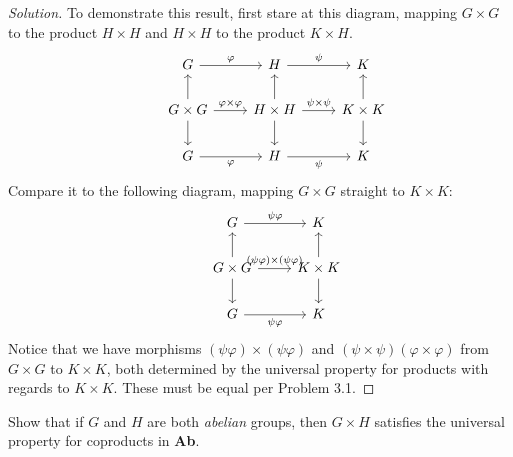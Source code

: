 \documentclass[12pt]{article}
\newenvironment{problem}[2][Problem]{\begin{trivlist}
\item[\hskip \labelsep {\bfseries #1}\hskip \labelsep {\bfseries #2.}]}{\end{trivlist}}
\newcommand{\catname}[1]{\normalfont\textbf{#1}}
\newenvironment{solution}
  {\renewcommand\qedsymbol{$\blacksquare$}\begin{proof}[Solution]}
{\end{proof}}
\begin{document}
\begin{solution}
  To demonstrate this result, first stare at this diagram, mapping 
  $G\times G$ to the product $H\times H$ and 
  $H\times H$ to the product $K\times H$.
  \[\begin{tikzcd}
    & G\ar{r}{\varphi} & H\ar{r}{\psi} & K \\
    & G\times G \ar{r}{\varphi\times\varphi}
    \ar{u}\ar{d} 
    & H\times H \ar{r}{\psi\times\psi}
    \ar{u}\ar{d} 
    & K\times K \ar{u} \ar{d} \\
    & G\ar{r}[swap]{\varphi} & H\ar{r}[swap]{\psi} & K 
\end{tikzcd}\]
Compare it to the following diagram, mapping 
$G\times G$ straight to $K\times K$:
\[\begin{tikzcd}
  & G\ar{r}{\psi\varphi} & K\\
  & G\times G \ar{r}{(\psi\varphi)\times(\psi\varphi)} 
  \ar{u} \ar{d} 
  & K\times K \ar{u} \ar{d} \\
  & G\ar{r}[swap]{\psi\varphi} & K
\end{tikzcd}\]
Notice that we have morphisms 
$(\psi\varphi) \times (\psi\varphi)$ and 
$(\psi\times\psi)(\varphi\times\varphi)$
from $G\times G$ to $K\times K$, both determined by the universal property for
products with regards to $K\times K$. 
These must be equal per Problem 3.1.
\end{solution}
\begin{problem}{3.3}
  Show that if $G$ and $H$ are both \textit{abelian} groups, then
  $G\times H$ satisfies the universal property for coproducts in 
  \catname{Ab}.
\end{problem}
\end{document}
